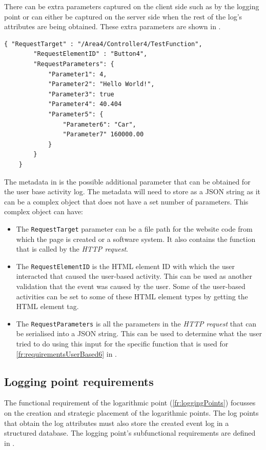 There can be extra parameters captured on the client side such as by the logging point or can either be captured on the server side when the rest of the log's attributes are being obtained. These extra parameters are shown in .

\begin{lstlisting}[style=json, caption={\textit{Metadata JSON}}, label={fig:ch2_MetadataJsonExample}] 
	{ "RequestTarget" : "/Area4/Controller4/TestFunction",
		"RequestElementID" : "Button4",
		"RequestParameters": {
			"Parameter1": 4,
			"Parameter2": "Hello World!",
			"Parameter3": true
			"Parameter4": 40.404
			"Parameter5": {
				"Parameter6": "Car",
				"Parameter7" 160000.00
			}
		}		
	}
\end{lstlisting}

The metadata in  is the possible additional parameter that can be obtained for the user base activity log. The metadata will need to store as a JSON string as it can be a complex object that does not have a set number of parameters. This complex object can have:

\begin{itemize}
	\item The \texttt{RequestTarget} parameter can be a file path for the website code from which the page is created or a software system. It also contains the function that is called by the \textit{HTTP request}.
	\item The \texttt{RequestElementID} is the HTML element ID with which the user interacted that caused the user-based activity. This can be used as another validation that the event was caused by the user. Some of the user-based activities can be set to some of these HTML element types by getting the HTML element tag.
	\item The \texttt{RequestParameters} is all the parameters in the \textit{HTTP request} that can be serialised into a JSON string. This can be used to determine what the user tried to do using this input for the specific function that is used for \ref{fr:requirementsUserBased6} in .
\end{itemize}

\subsection{Logging point requirements}\label{sec:ch2_serverFunctionalRequirements}
The functional requirement of the logarithmic point (\ref{fr:loggingPoints}) focusses on the creation and strategic placement of the logarithmic points. The log points that obtain the log attributes must also store the created event log in a structured database. The logging point's subfunctional requirements are defined in . 

